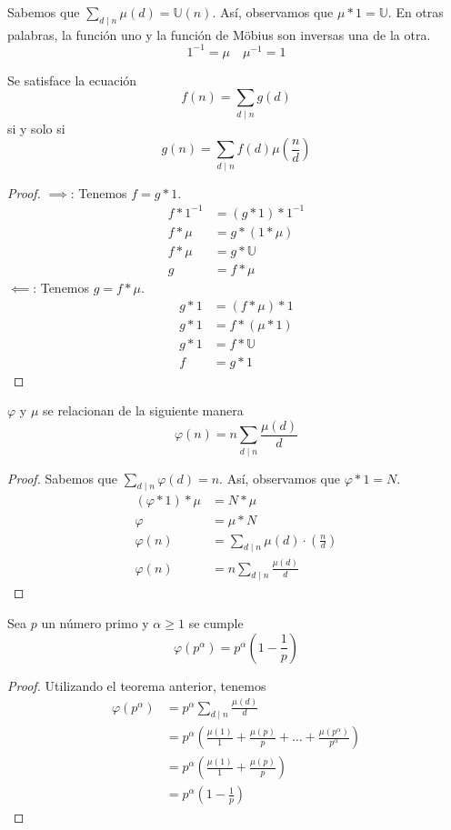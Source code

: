 \documentclass[main.tex]{subfiles}
\begin{document}
Sabemos que $\sum_{d \mid n}\mu(d) = \mathbb U(n)$. As\'i, observamos que $\mu * 1 = \mathbb U$. En otras palabras, la funci\'on uno y la funci\'on de M\"obius son inversas una de la otra.
$$1^{-1}=\mu \quad \mu^{-1}=1$$
\begin{theorem}
Se satisface la ecuaci\'on
$$f(n) = \sum_{d \mid n}g(d)$$
si y solo si
$$g(n) = \sum_{d \mid n} f(d)\mu(\frac{n}{d})$$
\end{theorem}
\begin{proof}
$\implies$: Tenemos $f = g * 1$.
\begin{align*}
    f * 1^{-1} &= (g * 1) * 1^{-1}\\
    f * \mu &= g * (1 * \mu)\\
    f * \mu &= g * \mathbb U\\
    g &= f * \mu
\end{align*}
$\impliedby$: Tenemos $g = f * \mu$.
\begin{align*}
    g * 1 &= (f * \mu) * 1\\
    g * 1 &= f * (\mu * 1)\\
    g * 1 &= f * \mathbb U\\
    f &= g * 1
\end{align*}
\end{proof}
\begin{theorem}
$\varphi$ y $\mu$ se relacionan de la siguiente manera
$$\varphi(n) = n\sum_{d \mid n}\frac{\mu(d)}{d}$$
\end{theorem}
\begin{proof}
Sabemos que $\sum_{d \mid n}\varphi(d) = n$. As\'i, observamos que $\varphi * 1 = N$.
\begin{align*}
    (\varphi * 1) * \mu &= N * \mu\\
    \varphi &= \mu * N\\
    \varphi(n) &= \sum_{d \mid n} \mu(d)\cdot(\frac{n}{d})\\
    \varphi(n) &= n\sum_{d \mid n} \frac{\mu(d)}{d}
\end{align*}
\end{proof}
\begin{theorem}
Sea $p$ un n\'umero primo y $\alpha \geq 1$ se cumple
$$\varphi(p^\alpha) = p^{\alpha}\left(1 - \frac{1}{p}\right)$$
\end{theorem}
\begin{proof}
Utilizando el teorema anterior, tenemos
\begin{align*}
    \varphi(p^\alpha) &= p^\alpha\sum_{d \mid n}\frac{\mu(d)}{d}\\
    &= p^\alpha\left(\frac{\mu(1)}{1} + \frac{\mu(p)}{p} + \dots + \frac{\mu(p^\alpha)}{p^\alpha}\right)\\
    &= p^\alpha\left(\frac{\mu(1)}{1} + \frac{\mu(p)}{p}\right)\\
    &= p^\alpha\left(1 - \frac{1}{p}\right)
\end{align*}
\end{proof}
\end{document}
